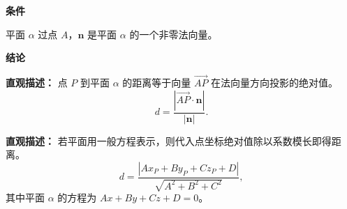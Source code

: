 \begin{statementbox}
	\textbf{\textcolor{CStatement}{条件}}
	\begin{description}[style=nextline, leftmargin=2.8em, labelsep=0.5em, itemsep=0.35em]
		\item[\textbf{\textcolor{CStatement}{条件 1（向量法元素）：}}] 平面 $\alpha$ 过点 $A$，$\mathbf{n}$ 是平面 $\alpha$ 的一个非零法向量。
	\end{description}

	\textbf{\textcolor{CStatement}{结论}}
	\begin{description}[style=nextline, leftmargin=2.8em, labelsep=0.5em, itemsep=0.45em]
		\item[\textbf{\textcolor{CStatement}{结论一（距离公式）：}}]
			\textbf{\textcolor{CStatement}{直观描述：}}
			点 $P$ 到平面 $\alpha$ 的距离等于向量 $\vec{AP}$ 在法向量方向投影的绝对值。
			\[
				d = \frac{|\vec{AP}\cdot\mathbf{n}|}{|\mathbf{n}|}.
			\]

		\item[\textbf{\textcolor{CStatement}{推广结论（平面方程形式）：}}]
			\textbf{\textcolor{CStatement}{直观描述：}}
			若平面用一般方程表示，则代入点坐标绝对值除以系数模长即得距离。
			\[
				d = \frac{|Ax_P+By_P+Cz_P+D|}{\sqrt{A^2+B^2+C^2}},
			\]
			其中平面 $\alpha$ 的方程为 $Ax+By+Cz+D=0$。
	\end{description}
\end{statementbox}
